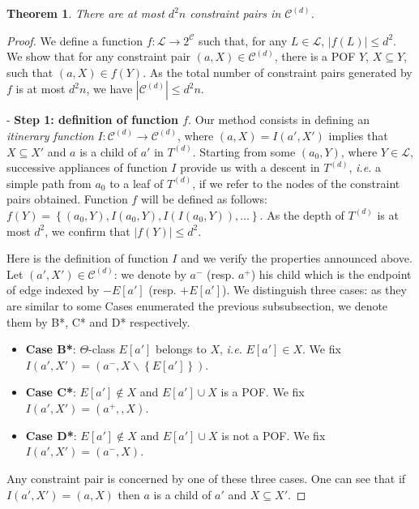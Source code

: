 \documentclass{article}
\newtheorem{theorem}{Theorem}
\newcommand{\set}[1]{\left\{ #1 \right\}}
\newcommand{\card}[1]{\left| #1 \right|}
\begin{document}
\begin{theorem}
There are at most $d^2n$ constraint pairs in $\mathcal{C}^{(d)}$.
\label{th:cardinality_c}
\end{theorem}
\begin{proof}
We define a function $f : \mathcal{L} \rightarrow 2^{\mathcal{C}}$ such that, for any $L \in \mathcal{L}$, $\card{f(L)} \le d^2$. We show that for any constraint pair $(a,X) \in \mathcal{C}^{(d)}$, there is a POF $Y$, $X \subseteq Y$, such that $(a,X) \in f(Y)$. As the total number of constraint pairs generated by $f$ is at most $d^2n$, we have $\card{\mathcal{C}^{(d)}} \le d^2n$.

- \textbf{Step 1: definition of function $f$}. Our method consists in defining an \textit{itinerary function} $I : \mathcal{C}^{(d)} \rightarrow \mathcal{C}^{(d)}$, where $(a,X) = I(a',X')$ implies that $X \subseteq X'$ and $a$ is a child of $a'$ in $T^{(d)}$. Starting from some $(a_0,Y)$, where $Y \in \mathcal{L}$, successive appliances of function $I$ provide us with a descent in $T^{(d)}$, {\em i.e.} a simple path from $a_0$ to a leaf of $T^{(d)}$, if we refer to the nodes of the constraint pairs obtained. Function $f$ will be defined as follows: $f(Y) = \set{(a_0,Y),I(a_0,Y),I(I(a_0,Y)),\ldots}$. As the depth of $T^{(d)}$ is at most $d^2$, we confirm that $\card{f(Y)}\le d^2$.

Here is the definition of function $I$ and we verify the properties announced above. Let $(a',X') \in \mathcal{C}^{(d)}$: we denote by $a^-$ (resp. $a^+$) his child which is the endpoint of edge indexed by $-E\left[a'\right]$ (resp. $+E\left[a'\right]$). We distinguish three cases: as they are similar to some Cases enumerated the previous subsubsection, we denote them by B*, C* and D* respectively.
\begin{itemize}
\item \textbf{Case B*}: $\Theta$-class $E\left[a'\right]$ belongs to $X$, {\em i.e.} $E\left[a'\right] \in X$. We fix $I(a',X') = (a^-,X\backslash \set{E\left[a'\right]})$.
\item \textbf{Case C*}: $E\left[a'\right] \notin X$ and $E\left[a'\right] \cup X$ is a POF. We fix $I(a',X') = (a^+,,X)$.
\item \textbf{Case D*}: $E\left[a'\right] \notin X$ and $E\left[a'\right] \cup X$ is not a POF. We fix $I(a',X') = (a^-,X)$.
\end{itemize}
Any constraint pair is concerned by one of these three cases. One can see that if $I(a',X') = (a,X)$ then $a$ is a child of $a'$ and $X \subseteq X'$.


\end{proof}
\end{document}
